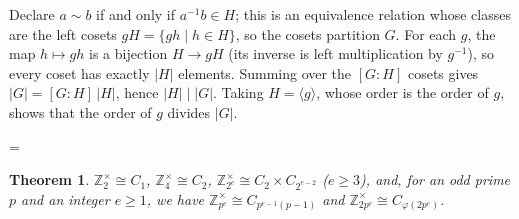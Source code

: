 \documentclass[11pt]{article}
\makeatletter
\theoremstyle{ntstyle}
\newtheorem{theorem}{Theorem}[subsection]
\let\nt@closedisplay\]
\def\nt@guardedclose{\@ifnextchar\par{\nt@closeafterpar}{\@ifnextchar\end{\postdisplaypenalty\@M\nt@closedisplay}{\nt@closedisplay}}}
\def\nt@closeafterpar\par{\@ifnextchar\par{\nt@closeafterpar}{\@ifnextchar\end{\postdisplaypenalty\@M\nt@closedisplay\par}{\nt@closedisplay\par}}}
\renewenvironment{proof}[1][\proofname]{\par
  \pushQED{\qed}\normalfont\topsep\medskipamount\edef\nt@afterproof{\@endparpenalty=\the\@endparpenalty\relax}\@beginparpenalty\@M\@endparpenalty\@M\let\]\nt@guardedclose\trivlist\item[]\textit{#1\@addpunct{.}} \ignorespaces}{\ifvmode\addpenalty\@M\fi\popQED\nt@afterproof\endtrivlist\@endpefalse}
\newcommand{\ZmodUnits}[1]{\mathbb{Z}_{#1}^{\times}}
\makeatother
\begin{document}
\begin{proof} Declare $a \sim b$ if and only if $a^{-1}b \in H$;
	this is an equivalence relation whose classes are the left cosets
	$gH = \{gh \mid h \in H\}$, so the cosets partition $G$. For each $g$,
	the map $h \mapsto gh$ is a bijection $H \to gH$ (its inverse is left
	multiplication by $g^{-1}$), so every coset has exactly $|H|$
	elements. Summing over the $[G:H]$ cosets gives $|G| = [G:H]\,|H|$,
	hence $|H| \mid |G|$. Taking $H = \langle g\rangle$, whose order is
	the order of $g$, shows that the order of $g$ divides $|G|$.

\end{proof}
\begin{theorem}\label{thm:6.6.3} $\ZmodUnits{2} \cong C_1$,
	$\ZmodUnits{4} \cong C_2$, $\ZmodUnits{2^{e}} \cong
		C_2 \times C_{2^{e-2}}$ ($e \ge 3$), and, for an odd prime $p$ and
	an integer $e\ge1$,
	we have $\ZmodUnits{p^{e}} \cong C_{p^{e-1}(p-1)}$ and $\ZmodUnits{2
			p^{e}} \cong C_{\varphi(2p^{e})}$.

\end{theorem}
\end{document}
